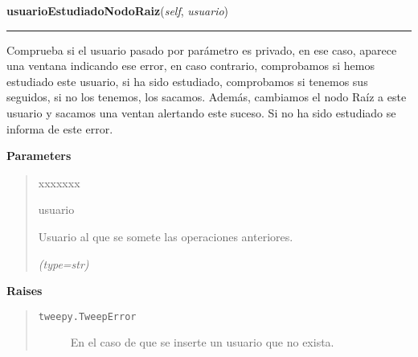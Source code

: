     \label{funcionesTwitter:FuncionesTwitter:usuarioEstudiadoNodoRaiz}

    \vspace{0.5ex}

\hspace{.8\funcindent}\begin{boxedminipage}{\funcwidth}

    \raggedright \textbf{usuarioEstudiadoNodoRaiz}(\textit{self}, \textit{usuario})

    \vspace{-1.5ex}

    \rule{\textwidth}{0.5\fboxrule}
\setlength{\parskip}{2ex}
    Comprueba si el usuario pasado por parámetro es privado, en ese caso, 
    aparece una ventana indicando ese error, en caso contrario, comprobamos
    si hemos estudiado este usuario, si ha sido estudiado, comprobamos si 
    tenemos sus seguidos, si no los tenemos, los sacamos. Además, cambiamos
    el nodo Raíz a este usuario y sacamos una ventan alertando este suceso.
    Si no ha sido estudiado se informa de este error.

\setlength{\parskip}{1ex}
      \textbf{Parameters}
      \vspace{-1ex}

      \begin{quote}
        \begin{Ventry}{xxxxxxx}

          \item[usuario]

          Usuario al que se somete las operaciones anteriores.

            {\it (type=str)}

        \end{Ventry}

      \end{quote}

      \textbf{Raises}
    \vspace{-1ex}

      \begin{quote}
        \begin{description}

          \item[\texttt{tweepy.TweepError}]

          En el caso de que se inserte un usuario que no exista.

        \end{description}

      \end{quote}

    \end{boxedminipage}

